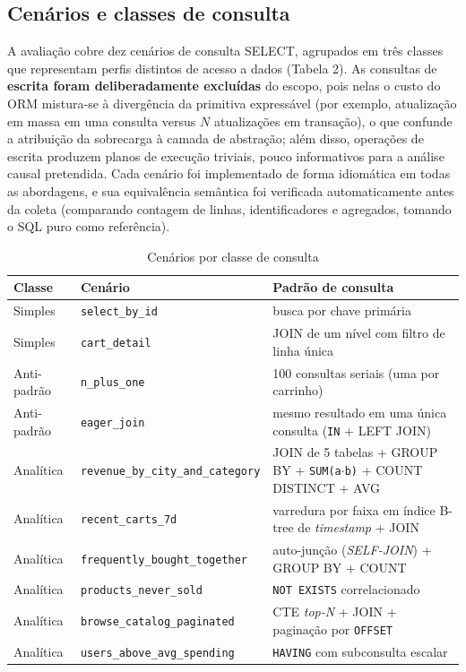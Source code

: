\documentclass[12pt]{article}
\begin{document}
\subsection{Cenários e classes de consulta}

A avaliação cobre dez cenários de consulta SELECT, agrupados em três
classes que representam perfis distintos de acesso a dados (Tabela 2). As
consultas de \textbf{escrita foram deliberadamente excluídas} do escopo,
pois nelas o custo do ORM mistura-se à divergência da primitiva
expressável (por exemplo, atualização em massa em uma consulta versus
$N$ atualizações em transação), o que confunde a atribuição da
sobrecarga à camada de abstração; além disso, operações de escrita produzem planos
de execução triviais, pouco informativos para a análise causal
pretendida. Cada cenário foi implementado de forma idiomática em todas as
abordagens, e sua equivalência semântica foi verificada automaticamente
antes da coleta (comparando contagem de linhas, identificadores e
agregados, tomando o SQL puro como referência).

\begin{table}[!htb]
\centering
\caption{Cenários por classe de consulta}
\label{tab:cenarios}
\scriptsize
\begin{tabular}{@{}p{1.6cm}p{4.3cm}p{6.4cm}@{}}
\toprule
Classe & Cenário & Padrão de consulta \\
\midrule
Simples & \texttt{select\_by\_id} & busca por chave primária \\
Simples & \texttt{cart\_detail} & JOIN de um nível com filtro de linha única \\
Anti-padrão & \texttt{n\_plus\_one} & 100 consultas seriais (uma por carrinho) \\
Anti-padrão & \texttt{eager\_join} & mesmo resultado em uma única consulta (\texttt{IN} + LEFT JOIN) \\
Analítica & \texttt{revenue\_by\_city\_and\_category} & JOIN de 5 tabelas + GROUP BY + \texttt{SUM(a$\cdot$b)} + COUNT DISTINCT + AVG \\
Analítica & \texttt{recent\_carts\_7d} & varredura por faixa em índice B-tree de \textit{timestamp} + JOIN \\
Analítica & \texttt{frequently\_bought\_together} & auto-junção (\textit{SELF-JOIN}) + GROUP BY + COUNT \\
Analítica & \texttt{products\_never\_sold} & \texttt{NOT EXISTS} correlacionado \\
Analítica & \texttt{browse\_catalog\_paginated} & CTE \textit{top-N} + JOIN + paginação por \texttt{OFFSET} \\
Analítica & \texttt{users\_above\_avg\_spending} & \texttt{HAVING} com subconsulta escalar \\
\bottomrule
\end{tabular}

\vspace{2pt}{\footnotesize Fonte: elaboração própria.}
\end{table}
\end{document}
